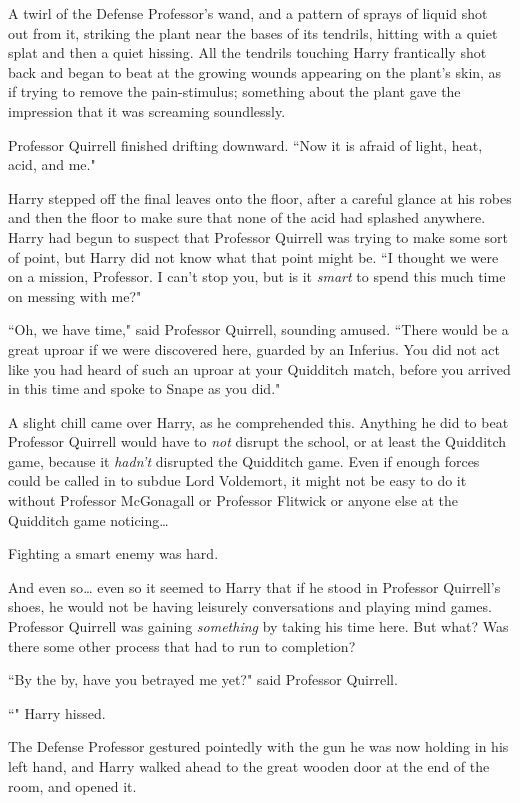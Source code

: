A twirl of the Defense Professor's wand, and a pattern of sprays of liquid shot out from it, striking the plant near the bases of its tendrils, hitting with a quiet splat and then a quiet hissing. All the tendrils touching Harry frantically shot back and began to beat at the growing wounds appearing on the plant's skin, as if trying to remove the pain-stimulus; something about the plant gave the impression that it was screaming soundlessly.

Professor Quirrell finished drifting downward. ``Now it is afraid of light, heat, acid, and me."

Harry stepped off the final leaves onto the floor, after a careful glance at his robes and then the floor to make sure that none of the acid had splashed anywhere. Harry had begun to suspect that Professor Quirrell was trying to make some sort of point, but Harry did not know what that point might be. ``I thought we were on a mission, Professor. I can't stop you, but is it \emph{smart} to spend this much time on messing with me?"

``Oh, we have time," said Professor Quirrell, sounding amused. ``There would be a great uproar if we were discovered here, guarded by an Inferius. You did not act like you had heard of such an uproar at your Quidditch match, before you arrived in this time and spoke to Snape as you did."

A slight chill came over Harry, as he comprehended this. Anything he did to beat Professor Quirrell would have to \emph{not} disrupt the school, or at least the Quidditch game, because it \emph{hadn't} disrupted the Quidditch game. Even if enough forces could be called in to subdue Lord Voldemort, it might not be easy to do it without Professor McGonagall or Professor Flitwick or anyone else at the Quidditch game noticing{\ldots}

Fighting a smart enemy was hard.

And even so{\ldots} even so it seemed to Harry that if he stood in Professor Quirrell's shoes, he would not be having leisurely conversations and playing mind games. Professor Quirrell was gaining \emph{something} by taking his time here. But what? Was there some other process that had to run to completion?

``By the by, have you betrayed me yet?" said Professor Quirrell.

``" Harry hissed.

The Defense Professor gestured pointedly with the gun he was now holding in his left hand, and Harry walked ahead to the great wooden door at the end of the room, and opened it.

